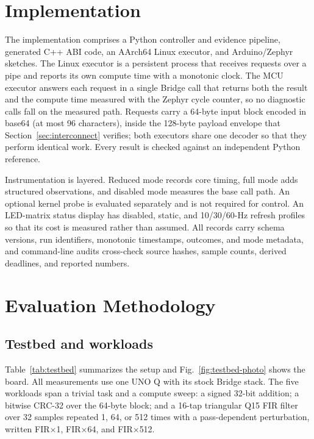 \documentclass[conference]{IEEEtran}
\begin{document}
\section{Implementation}
\label{sec:impl}
The implementation comprises a Python controller and evidence pipeline,
generated C++ ABI code, an AArch64 Linux executor, and Arduino/Zephyr sketches.
The Linux executor is a persistent process that receives requests over a pipe
and reports its own compute time with a monotonic clock. The MCU executor
answers each request in a single Bridge call that returns both the result and
the compute time measured with the Zephyr cycle counter, so no diagnostic
calls fall on the measured path. Requests carry a 64-byte input block encoded
in base64 (at most 96 characters), inside the 128-byte payload envelope that
Section~\ref{sec:interconnect} verifies; both executors share one decoder so
that they perform identical work. Every result is checked against an
independent Python reference.

Instrumentation is layered. Reduced mode records core timing, full mode adds
structured observations, and disabled mode measures the base call path. An
optional kernel probe is evaluated separately and is not required for
control. An LED-matrix status display has disabled, static, and 10/30/60-Hz
refresh profiles so that its cost is measured rather than assumed. All
records carry schema versions, run identifiers, monotonic timestamps,
outcomes, and mode metadata, and command-line audits cross-check source
hashes, sample counts, derived deadlines, and reported numbers.

\section{Evaluation Methodology}
\label{sec:method}
\subsection{Testbed and workloads}
Table~\ref{tab:testbed} summarizes the setup and Fig.~\ref{fig:testbed-photo}
shows the board. All measurements use one UNO Q with its stock Bridge stack.
The five workloads span a trivial task and a compute sweep: a signed 32-bit
addition; a bitwise CRC-32 over the 64-byte block; and a 16-tap triangular
Q15 FIR filter over 32 samples repeated 1, 64, or 512 times with a
pass-dependent perturbation, written FIR$\times$1, FIR$\times$64, and
FIR$\times$512.
\end{document}
